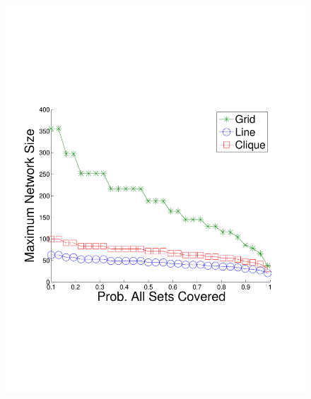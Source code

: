\begin{figure}
{	\includegraphics[scale=0.22, clip=true, trim=14mm 65mm 25mm 65mm]{figures/use_cases_examples/cluster/num_nodes_vs_cluster_perc_cov_10_T_2_W_color.pdf}
        \label{fig:use_case_num_nodes_vs_qoi}
        }
  \subfigure[Max N vs. Timeliness (Prob. All Sets Covered = 0.8)]{
}
\end{figure}
